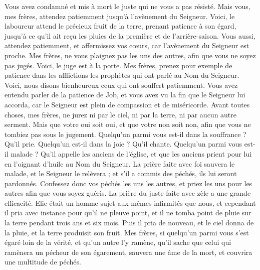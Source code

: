 \begin{multicols}{2}
Vous avez condamné et mis à mort le juste qui ne vous a pas résisté.
Mais vous, mes frères, attendez patiemment jusqu'à l’avènement du Seigneur. Voici, le laboureur attend le précieux fruit de la terre, prenant patience à son égard, jusqu'à ce qu'il ait reçu les pluies de la première et de l’arrière-saison.
Vous aussi, attendez patiemment, et affermissez vos cœurs, car l’avènement du Seigneur est proche.
Mes frères, ne vous plaignez pas les uns des autres, afin que vous ne soyez pas jugés. Voici, le juge est à la porte.
Mes frères, prenez pour exemple de patience dans les afflictions les prophètes qui ont parlé au Nom du Seigneur.
Voici, nous disons bienheureux ceux qui ont souffert patiemment. Vous avez entendu parler de la patience de Job, et vous avez vu la fin que le Seigneur lui accorda, car le Seigneur est plein de compassion et de miséricorde.
Avant toutes choses, mes frères, ne jurez ni par le ciel, ni par la terre, ni par aucun autre serment. Mais que votre oui soit oui, et que votre non soit non, afin que vous ne tombiez pas sous le jugement{}.
Quelqu’un parmi vous est-il dans la souffrance ? Qu’il prie. Quelqu’un est-il dans la joie ? Qu’il chante.
Quelqu’un parmi vous est-il malade ? Qu’il appelle les anciens de l'église, et que les anciens prient pour lui en l’oignant d'huile au Nom du Seigneur.
La prière faite avec foi sauvera le malade, et le Seigneur le relèvera ; et s'il a commis des péchés, ils lui seront pardonnés.
Confessez donc vos péchés les uns les autres, et priez les uns pour les autres afin que vous soyez guéris. La prière du juste faite avec zèle a une grande efficacité.
Elie était un homme sujet aux mêmes infirmités que nous, et cependant il pria avec instance pour qu'il ne pleuve point, et il ne tomba point de pluie sur la terre pendant trois ans et six mois{}.
Puis il pria de nouveau, et le ciel donna de la pluie, et la terre produisit son fruit.
\TextTitle{[Conclusion]}
Mes frères, si quelqu'un parmi vous s’est égaré loin de la vérité, et qu’un autre l'y ramène,
qu'il sache que celui qui ramènera un pécheur de son égarement, sauvera une âme de la mort, et couvrira une multitude de péchés.
\PPE{}
\end{multicols}
